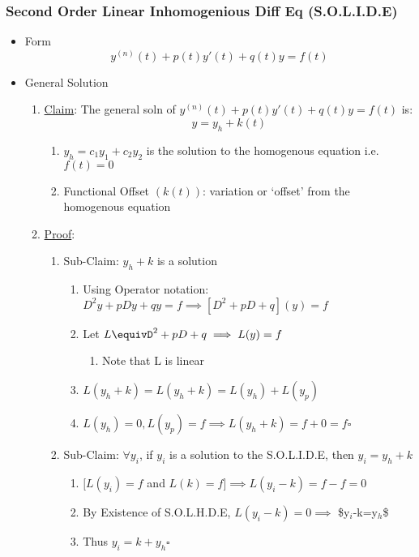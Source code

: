 \documentclass[11pt]{article}
\begin{document}
\subsubsection{Second Order Linear Inhomogenious Diff Eq (S.O.L.I.D.E)}
\label{sec-9-2-5}
\begin{itemize}

\item Form\\
\label{sec-9-2-5-1}%
\begin{equation}
     y^{(n)}(t)+p(t)y'(t)+q(t)y=f(t)
     \end{equation}

\item General Solution
\label{sec-9-2-5-2}%
\begin{enumerate}
\item \underline{Claim}: The general soln of $y^{(n)}(t)+p(t)y'(t)+q(t)y=f(t)$ is:
         \begin{equation}
         y=y_h+k(t)
         \end{equation}
\begin{enumerate}
\item $y_h = c_1y_1+c_2y_2$ is the solution to the homogenous
            equation i.e. $f(t)=0$
\item Functional Offset $(k(t))$: variation or `offset' from the homogenous equation
\end{enumerate}
\item \underline{Proof}:
\begin{enumerate}
\item Sub-Claim: $y_h+k$ is a solution
\begin{enumerate}
\item Using Operator notation: $D^2y+pDy+qy=f \implies [D^2+pD+q](y)=f$
\item Let $L\equivD^2+pD+q \implies L(y)=f$
\begin{enumerate}
\item Note that L is linear
\end{enumerate}
\item $L(y_h+k) = L(y_h+k)=L(y_h)+L(y_p)$
\item $L(y_h)=0,L(y_p)=f \implies L(y_h+k)=f+0 = f \square$
\end{enumerate}
\item Sub-Claim: $\forall y_i$, if $y_i$ is a solution to the
            S.O.L.I.D.E, then $y_i=y_h+k$
\begin{enumerate}
\item $[L(y_i)=f$ and $L(k)=f] \implies L(y_i-k) = f-f=0$
\item By Existence of S.O.L.H.D.E, $L(y_i-k)=0 \implies$ \$y$_i$-k=y$_h$\$
\item Thus $y_i=k+y_h \square$
\end{enumerate}
\end{enumerate}
\end{enumerate}


\end{itemize}
\end{document}
